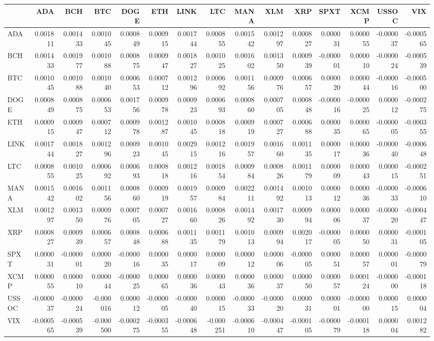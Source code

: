 \begin{tabular}{lrrrrrrrrrrrrrr}
\toprule
 & ADA & BCH & BTC & DOGE & ETH & LINK & LTC & MANA & XLM & XRP & SPXT & XCMP & USSOC & VIX \\
\midrule
ADA & 0.001811 & 0.001433 & 0.001045 & 0.000849 & 0.000915 & 0.001744 & 0.000855 & 0.001542 & 0.001297 & 0.000827 & 0.000031 & 0.000055 & -0.000037 & -0.000565 \\
BCH & 0.001433 & 0.001977 & 0.001088 & 0.000875 & 0.000947 & 0.001827 & 0.001025 & 0.001602 & 0.001350 & 0.000939 & -0.000001 & 0.000010 & -0.000024 & -0.000539 \\
BTC & 0.001045 & 0.001088 & 0.001040 & 0.000653 & 0.000712 & 0.001296 & 0.000692 & 0.001156 & 0.000976 & 0.000657 & 0.000020 & 0.000044 & -0.000016 & -0.000500 \\
DOGE & 0.000849 & 0.000875 & 0.000653 & 0.001756 & 0.000978 & 0.000923 & 0.000693 & 0.000860 & 0.000705 & 0.000848 & -0.000016 & -0.000025 & 0.000012 & -0.000275 \\
ETH & 0.000915 & 0.000947 & 0.000712 & 0.000978 & 0.001287 & 0.001045 & 0.000818 & 0.000919 & 0.000727 & 0.000688 & 0.000035 & 0.000065 & -0.000005 & -0.000355 \\
LINK & 0.001744 & 0.001827 & 0.001296 & 0.000923 & 0.001045 & 0.002915 & 0.001216 & 0.001957 & 0.001660 & 0.001135 & 0.000017 & 0.000036 & -0.000040 & -0.000648 \\
LTC & 0.000855 & 0.001025 & 0.000692 & 0.000693 & 0.000818 & 0.001216 & 0.001854 & 0.000984 & 0.000826 & 0.001179 & 0.000009 & 0.000043 & 0.000015 & -0.000251 \\
MANA & 0.001542 & 0.001602 & 0.001156 & 0.000860 & 0.000919 & 0.001957 & 0.000984 & 0.002211 & 0.001492 & 0.001013 & 0.000012 & 0.000036 & -0.000033 & -0.000610 \\
XLM & 0.001297 & 0.001350 & 0.000976 & 0.000705 & 0.000727 & 0.001660 & 0.000826 & 0.001492 & 0.001730 & 0.000994 & 0.000006 & 0.000037 & -0.000020 & -0.000447 \\
XRP & 0.000827 & 0.000939 & 0.000657 & 0.000848 & 0.000688 & 0.001135 & 0.001179 & 0.001013 & 0.000994 & 0.002017 & -0.000005 & 0.000050 & 0.000031 & -0.000105 \\
SPXT & 0.000031 & -0.000001 & 0.000020 & -0.000016 & 0.000035 & 0.000017 & 0.000009 & 0.000012 & 0.000006 & -0.000005 & 0.000051 & 0.000057 & 0.000001 & -0.000079 \\
XCMP & 0.000055 & 0.000010 & 0.000044 & -0.000025 & 0.000065 & 0.000036 & 0.000043 & 0.000036 & 0.000037 & 0.000050 & 0.000057 & 0.000124 & -0.000000 & -0.000118 \\
USSOC & -0.000037 & -0.000024 & -0.000016 & 0.000012 & -0.000005 & -0.000040 & 0.000015 & -0.000033 & -0.000020 & 0.000031 & 0.000001 & -0.000000 & 0.000015 & 0.000004 \\
VIX & -0.000565 & -0.000539 & -0.000500 & -0.000275 & -0.000355 & -0.000648 & -0.000251 & -0.000610 & -0.000447 & -0.000105 & -0.000079 & -0.000118 & 0.000004 & 0.001282 \\
\bottomrule
\end{tabular}
